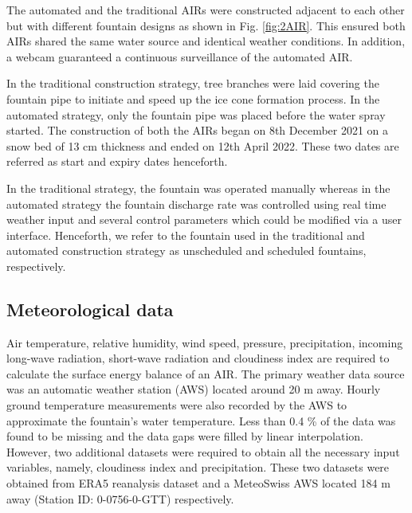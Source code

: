 \documentclass[tc, manuscript]{copernicus}
\begin{document}
The automated and the traditional AIRs were constructed adjacent to each other but with different fountain
designs as shown in Fig. \ref{fig:2AIR}. This ensured both AIRs shared the same water source and identical
weather conditions. In addition, a webcam guaranteed a continuous surveillance of the automated AIR.   

In the traditional construction strategy, tree branches were laid covering the fountain pipe to initiate and
speed up the ice cone formation process. In the automated strategy, only the fountain pipe was placed before the
water spray started. The construction of both the AIRs began on 8th December 2021 on a snow bed of 13 cm thickness
and ended on 12th April 2022. These two dates are referred as start and expiry dates henceforth.

In the traditional strategy, the fountain was operated manually whereas in the automated strategy the fountain
discharge rate was controlled using real time weather input and several control parameters which could be
modified via a user interface. Henceforth, we refer to the fountain used in the traditional and automated
construction strategy as unscheduled and scheduled fountains, respectively.


\subsection{Meteorological data}

Air temperature, relative humidity, wind speed, pressure, precipitation, incoming long-wave radiation,
short-wave radiation and cloudiness index are required to calculate the surface energy balance of an AIR. The
primary weather data source was an automatic weather station (AWS) located around 20 m away. Hourly ground
temperature measurements were also recorded by the AWS to approximate the fountain's water temperature. Less
than 0.4 \% of the data was found to be missing and the data gaps were filled by linear interpolation. However,
two additional datasets were required to obtain all the necessary input variables, namely, cloudiness index and
precipitation. These two datasets were obtained from ERA5 reanalysis dataset
\citep{hersbachERA5GlobalReanalysis2020} and a MeteoSwiss AWS located 184 m away (Station ID: 0-0756-0-GTT)
respectively.
\end{document}
